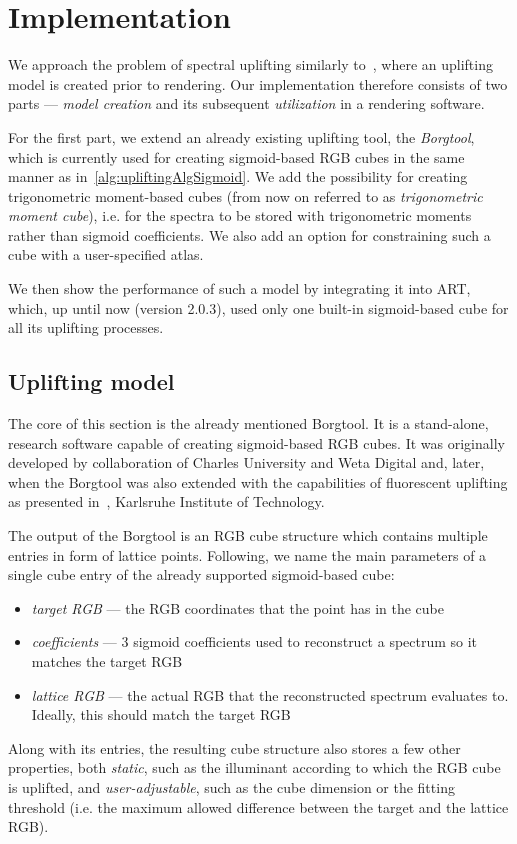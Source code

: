 \chapter{Implementation} \label{chap:implementation}

We approach the problem of spectral uplifting similarly to~\citet{upsamplingJakobHanika}, where an uplifting model is created prior to rendering. Our implementation therefore consists of two parts --- \emph{model creation} and its subsequent \emph{utilization} in a rendering software. 

For the first part, we extend an already existing uplifting tool, the \emph{Borgtool}, which is currently used for creating sigmoid-based RGB cubes in the same manner as in~\cref{alg:upliftingAlgSigmoid}. We add the possibility for creating trigonometric moment-based cubes (from now on referred to as \emph{trigonometric moment cube}), i.e. for the spectra to be stored with trigonometric moments rather than sigmoid coefficients. We also add an option for constraining such a cube with a user-specified atlas.

We then show the performance of such a model by integrating it into ART, which, up until now (version 2.0.3), used only one built-in sigmoid-based cube for all its uplifting processes.

\section{Uplifting model}

The core of this section is the already mentioned Borgtool. It is a stand-alone, research software capable of creating sigmoid-based RGB cubes. It was originally developed by collaboration of Charles University and Weta Digital and, later, when the Borgtool was also extended with the capabilities of fluorescent uplifting as presented in~\cite{upsamplingFluorescence}, Karlsruhe Institute of Technology.

The output of the Borgtool is an RGB cube structure which contains multiple entries in form of lattice points. Following, we name the main parameters of a single cube entry of the already supported sigmoid-based cube:
\begin{itemize}
	\item \emph{target RGB} --- the RGB coordinates that the point has in the cube
	\item \emph{coefficients} --- 3 sigmoid coefficients used to reconstruct a spectrum so it matches the target RGB
	\item \emph{lattice RGB} --- the actual RGB that the reconstructed spectrum evaluates to. Ideally, this should match the target RGB
\end{itemize}
Along with its entries, the resulting cube structure also stores a few other properties, both \emph{static}, such as the illuminant according to which the RGB cube is uplifted, and \emph{user-adjustable}, such as the cube dimension or the fitting threshold (i.e. the maximum allowed difference between the target and the lattice RGB).

